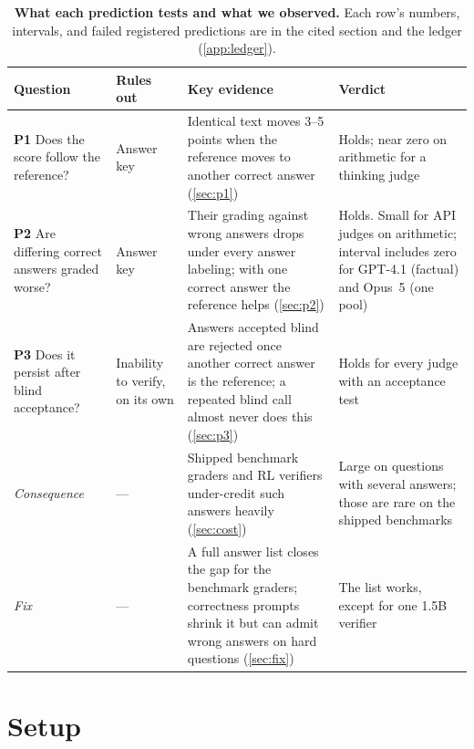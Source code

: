\documentclass{article}
\begin{document}
\begin{table}[t]
\centering
\small
\caption{\textbf{What each prediction tests and what we observed.} Each row's numbers, intervals, and failed registered predictions are in the cited section and the ledger (\cref{app:ledger}).}
\label{tab:summary}
\setlength{\tabcolsep}{4pt}
\renewcommand{\arraystretch}{1.12}
\begin{tabular}{L{2.9cm}L{2.0cm}L{5.0cm}L{2.7cm}}
\toprule
Question & Rules out & Key evidence & Verdict \\
\midrule
\textbf{P1} Does the score follow the reference? & Answer key & Identical text moves 3--5 points when the reference moves to another correct answer (\cref{sec:p1}) & Holds; near zero on arithmetic for a thinking judge \\
\addlinespace[2pt]
\textbf{P2} Are differing correct answers graded worse? & Answer key & Their grading against wrong answers drops under every answer labeling; with one correct answer the reference helps (\cref{sec:p2}) & Holds. Small for API judges on arithmetic; interval includes zero for GPT-4.1 (factual) and Opus~5 (one pool) \\
\addlinespace[2pt]
\textbf{P3} Does it persist after blind acceptance? & Inability to verify, on its own & Answers accepted blind are rejected once another correct answer is the reference; a repeated blind call almost never does this (\cref{sec:p3}) & Holds for every judge with an acceptance test \\
\addlinespace[2pt]
\emph{Consequence} & --- & Shipped benchmark graders and RL verifiers under-credit such answers heavily (\cref{sec:cost}) & Large on questions with several answers; those are rare on the shipped benchmarks \\
\addlinespace[2pt]
\emph{Fix} & --- & A full answer list closes the gap for the benchmark graders; correctness prompts shrink it but can admit wrong answers on hard questions (\cref{sec:fix}) & The list works, except for one 1.5B verifier \\
\bottomrule
\end{tabular}
\end{table}

\section{Setup}
\label{sec:setup}
\end{document}
